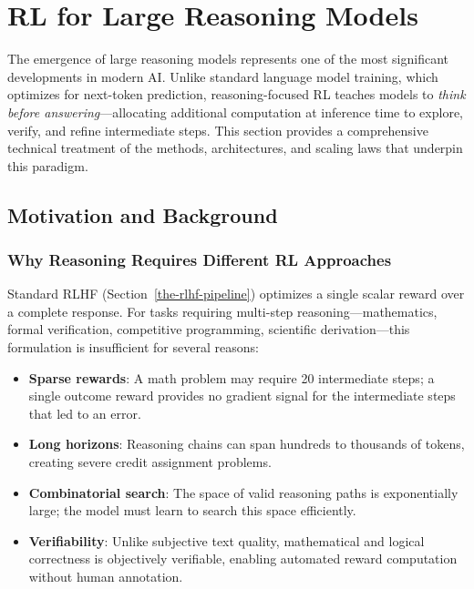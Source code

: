 \chapter{RL for Large Reasoning Models}
\label{sec:rl_reasoning}

The emergence of large reasoning models represents one of the most significant developments in modern AI. Unlike standard language model training, which optimizes for next-token prediction, reasoning-focused RL teaches models to \emph{think before answering}---allocating additional computation at inference time to explore, verify, and refine intermediate steps. This section provides a comprehensive technical treatment of the methods, architectures, and scaling laws that underpin this paradigm.

\section{Motivation and Background}
\label{subsec:reasoning_motivation}

\subsection{Why Reasoning Requires Different RL Approaches}
\label{why-reasoning-requires-different-rl-approaches}

Standard RLHF (Section~\ref{the-rlhf-pipeline}) optimizes a single scalar reward over a complete response. For tasks requiring multi-step reasoning---mathematics, formal verification, competitive programming, scientific derivation---this formulation is insufficient for several reasons:

\begin{itemize}
  \item \textbf{Sparse rewards}: A math problem may require 20 intermediate steps; a single outcome reward provides no gradient signal for the intermediate steps that led to an error.
  \item \textbf{Long horizons}: Reasoning chains can span hundreds to thousands of tokens, creating severe credit assignment problems.
  \item \textbf{Combinatorial search}: The space of valid reasoning paths is exponentially large; the model must learn to search this space efficiently.
  \item \textbf{Verifiability}: Unlike subjective text quality, mathematical and logical correctness is objectively verifiable, enabling automated reward computation without human annotation.
\end{itemize}

